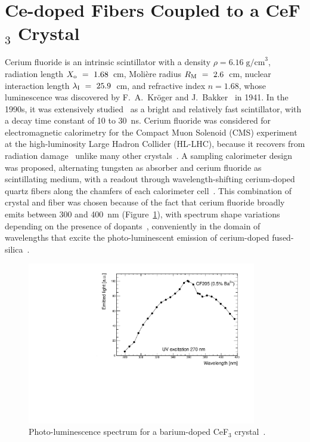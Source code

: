 \documentclass[a4paper,11pt]{article}
\begin{document}
\section{Ce-doped Fibers Coupled to a CeF\texorpdfstring{$_3$}{} Crystal}
\label{sec:WLS}
Cerium fluoride is an intrinsic scintillator with a density $\rho=6.16\; {\mathrm{g/cm}}^3$, radiation length $X_{\rm o}~=~1.68$~cm, Moli\`ere radius $R_{\rm M}~=~2.6$~cm, nuclear interaction length $\lambda_{\rm I}~=~25.9$~cm, and refractive index $n = 1.68$, whose luminescence was discovered by F.~A.~Kr\"oger and J.~Bakker~\cite{r-KRO} in 1941. In the 1990s, it was extensively studied~\cite{r-AND,r-MOS} as a bright and relatively fast scintillator, with a decay time constant of 10 to 30~ns. Cerium fluoride was considered for electromagnetic calorimetry for the Compact Muon Solenoid (CMS) experiment at the high-luminosity Large Hadron Collider (HL-LHC), because it recovers from radiation damage~\cite{r-NIMCEF3} unlike many other crystals~\cite{r-FISSNIM, r-NIMLYSO}. A sampling calorimeter design was proposed, alternating tungsten as absorber and cerium fluoride as scintillating medium, with a readout through wavelength-shifting cerium-doped quartz fibers along the chamfers of each calorimeter cell~\cite{r-CALORCEF3, r-WCEF3FRA, r-WCEF3H4}. This combination of crystal and fiber was chosen because of the fact that cerium fluoride broadly emits between 300 and 400~nm (Figure~\ref{fig:cef3spectrum}), with spectrum shape variations depending on the presence of dopants~\cite{r-EACEF3}, conveniently in the domain of wavelengths that excite the photo-luminescent emission of cerium-doped fused-silica~\cite{r-vedda}.

\begin{figure}[ht]
\begin{center}
      \includegraphics[width=10cm]{Figures/SpectrumCeF3.pdf}
\caption{\small Photo-luminescence spectrum for a barium-doped CeF$_3$ crystal~\cite{r-EACEF3}.}
    \label{fig:cef3spectrum}
\end{center}
\end{figure}
\end{document}
